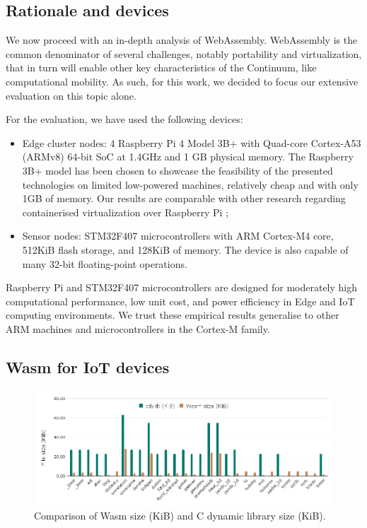 \subsection{Rationale and devices}

We now proceed with an in-depth analysis of WebAssembly. WebAssembly is the common denominator of several challenges, notably portability and virtualization, that in turn will enable other key characteristics of the Continuum, like computational mobility. As such, for this work, we decided to focus our extensive evaluation on this topic alone.

For the evaluation, we have used the following devices:

\begin{itemize}
    \item Edge cluster nodes: 4 Raspberry Pi 4 Model 3B+ with Quad-core Cortex-A53 (ARMv8) 64-bit SoC at 1.4GHz and 1 GB physical memory. The Raspberry 3B+ model has been chosen to showcase the feasibility of the presented technologies on limited low-powered machines, relatively cheap and with only 1GB of memory. Our results are comparable with other research regarding containerised virtualization over Raspberry Pi \cite{bellavista2017feasibility};
    \item Sensor nodes: STM32F407 microcontrollers with ARM Cortex-M4 core, 512KiB flash storage, and 128KiB of memory. The device is also capable of many 32-bit floating-point operations.
\end{itemize}

Raspberry Pi and STM32F407 microcontrollers are designed for moderately high computational performance, low unit cost, and power efficiency in Edge and IoT computing environments. We trust these empirical results generalise to other ARM machines and microcontrollers in the Cortex-M family.

\subsection{Wasm for IoT devices}

\begin{figure}[ht]
\centering
\includegraphics[width=\columnwidth]{figures/b-wasmi-3}
\caption{Comparison of Wasm size (KiB) and C dynamic library size (KiB).} \label{fig:b-wasmi-3}
\end{figure}

